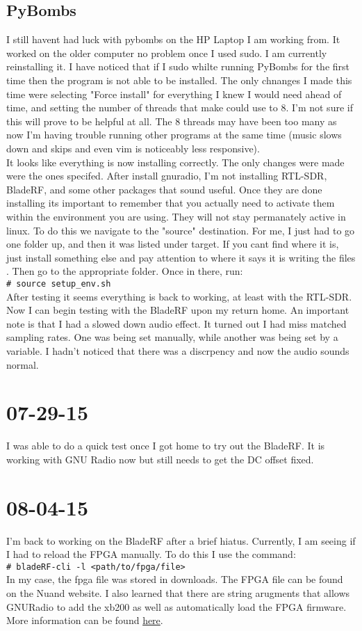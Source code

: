 \documentclass{article}
\newcommand{\shellcmd}[1]{\\\indent\indent\texttt{\footnotesize\# #1}\\}
\begin{document}
	\subsection{PyBombs}
	I still havent had luck with pybombs on the HP Laptop I am working from. It worked on the older computer no problem once I used sudo. I am currently reinstalling it. I have noticed that
	if I sudo whilte running PyBombs for the first time then the program is not able to be installed. The only chnanges I made this time were selecting "Force install" for everything I knew
	I would need ahead of time, and setting the number of threads that make could use to 8. I'm not sure if this will prove to be helpful at all. The 8 threads may have been too many as now
	I'm having trouble running other programs at the same time (music slows down and skips and even vim is noticeably less responsive). 		
	\\It looks like everything is now installing correctly. The only changes were made were the ones specifed. 
	After install gnuradio, I'm not installing RTL-SDR, BladeRF, and some other packages that
	sound useful. Once they are done installing its important to remember that you actually
	need to activate them within the environment you are using. They will not stay 
	permanately active in linux. To do this we navigate to the "source" destination. For me,
	I just had to go one folder up, and then it was listed under target. If you cant find where
	it is, just install something else and pay attention to where it says it is writing the files
	. Then go to the appropriate folder. Once in there, run:
	\shellcmd{source setup\_env.sh}
	After testing it seems everything is back to working, at least with the RTL-SDR. Now I can
	begin testing with the BladeRF upon my return home. An important note is that I had
	a slowed down audio effect. It turned out I had miss matched sampling rates. One was being
	set manually, while another was being set by a variable. I hadn't noticed that there
	was a discrpency and now the audio sounds normal. 


	\section{07-29-15}
	I was able to do a quick test once I got home to try out the BladeRF. It is working with 
	GNU Radio now but still needs to get the DC offset fixed. 

	\section{08-04-15}
	I'm back to working on the BladeRF after a brief hiatus. Currently, I am seeing if I had to
	reload the FPGA manually. To do this I use the command:
	\shellcmd{bladeRF-cli -l <path/to/fpga/file>}
	In my case, the fpga file was stored in downloads. The FPGA file can be found on the Nuand
	website. I also learned that there are string arugments that allows GNURadio to add the xb200
	as well as automatically load the FPGA firmware. More information can be found
	\href{http://sdr.osmocom.org/trac/wiki/GrOsmoSDR}{here}. 
\end{document}
